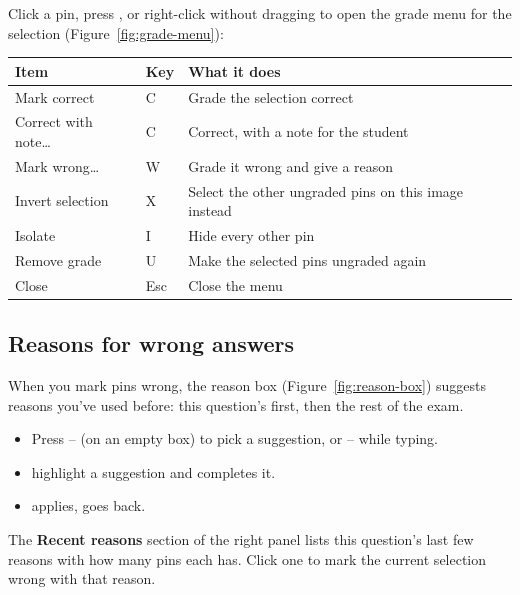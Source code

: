 Click a pin, press \keycap{\returnsym{}}, or right-click without dragging to open the grade menu for the selection (Figure~\ref{fig:grade-menu}):

\begingroup\renewcommand{\arraystretch}{1.35}
\noindent\begin{tabularx}{\linewidth}{YYY}
\toprule
\textbf{Item} & \textbf{Key} & \textbf{What it does} \\
\midrule
Mark correct & C & Grade the selection correct \\
Correct with note\ldots{} & \shiftsym{}C & Correct, with a note for the student \\
Mark wrong\ldots{} & W & Grade it wrong and give a reason \\
Invert selection & X & Select the other ungraded pins on this image instead \\
Isolate & I & Hide every other pin \\
Remove grade & U & Make the selected pins ungraded again \\
Close & Esc & Close the menu \\
\bottomrule
\end{tabularx}\endgroup\par\medskip

\tocoff
\subsection{Reasons for wrong answers}\label{sec:grading:reasons-for-wrong-answers}
\tocon

When you mark pins wrong, the reason box (Figure~\ref{fig:reason-box}) suggests reasons you've used before: this question's first, then the rest of the exam.

\begin{itemize}[topsep=2pt, itemsep=2pt]
\item Press -- (on an empty box) to pick a suggestion, or \keycap{\cmdsym{}}\keyplus{}--\keycap{\cmdsym{}}\keyplus{} while typing.
\item \keycap{\ensuremath{\uparrow}} \keycap{\ensuremath{\downarrow}} highlight a suggestion and \keycap{\tabsym{}} completes it.
\item \keycap{\returnsym{}} applies,  goes back.
\end{itemize}

The \textbf{Recent reasons} section of the right panel lists this question's last few reasons with how many pins each has. Click one to mark the current selection wrong with that reason.

